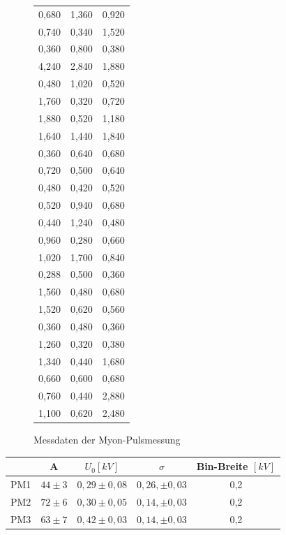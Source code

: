 \begin{figure}[htbp]
\begin{tabular}{c|c|c}
                        0,680 & 1,360 & 0,920\\
                        0,740 & 0,340 & 1,520\\
                        0,360 & 0,800 & 0,380\\
                        4,240 & 2,840 & 1,880\\
                        0,480 & 1,020 & 0,520\\
                        1,760 & 0,320 & 0,720\\
                        1,880 & 0,520 & 1,180\\
                        1,640 & 1,440 & 1,840\\
                        0,360 & 0,640 & 0,680\\
                        0,720 & 0,500 & 0,640\\
                        0,480 & 0,420 & 0,520\\
                        0,520 & 0,940 & 0,680\\
                        0,440 & 1,240 & 0,480\\
                        0,960 & 0,280 & 0,660\\
                        1,020 & 1,700 & 0,840\\
                        0,288 & 0,500 & 0,360\\
                        1,560 & 0,480 & 0,680\\
                        1,520 & 0,620 & 0,560\\
                        0,360 & 0,480 & 0,360\\
                        1,260 & 0,320 & 0,380\\
                        1,340 & 0,440 & 1,680\\
                        0,660 & 0,600 & 0,680\\
                        0,760 & 0,440 & 2,880\\
                        1,100 & 0,620 & 2,480\\
                    \end{tabular}
                    \caption{Messdaten der Myon-Pulsmessung}
                    \label{pulsen} 
                \end{figure}
                \begin{tabular}{c|c|c|c|c}
                    & A & $U_0 [\unit{kV}]$ & $\sigma$ & Bin-Breite $[\unit{kV}]$\\
                    \hline     PM1& $44\pm3$ & $0,29\pm0,08$ & $0,26,\pm0,03$& 0,2\\
                    PM2& $72\pm6$ & $0,30\pm0,05$ & $0,14,\pm0,03$& 0,2\\
                    PM3& $63\pm7$ & $0,42\pm0,03$ & $0,14,\pm0,03$& 0,2
                \end{tabular}
